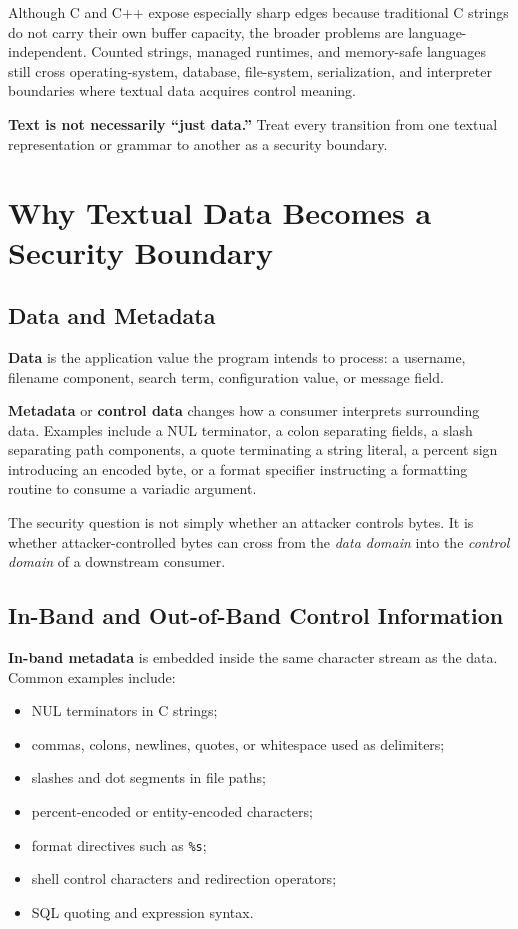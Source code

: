 \documentclass[11pt]{article}
\newcommand{\term}[1]{\textbf{#1}}
\begin{document}
Although C and C++ expose especially sharp edges because traditional C strings do not carry their own buffer capacity, the broader problems are language-independent. Counted strings, managed runtimes, and memory-safe languages still cross operating-system, database, file-system, serialization, and interpreter boundaries where textual data acquires control meaning.

\begin{securityprinciple}
\textbf{Text is not necessarily ``just data.''} Treat every transition from one textual representation or grammar to another as a security boundary.
\end{securityprinciple}

\section{Why Textual Data Becomes a Security Boundary}

\subsection{Data and Metadata}

\term{Data} is the application value the program intends to process: a username, filename component, search term, configuration value, or message field.

\term{Metadata} or \term{control data} changes how a consumer interprets surrounding data. Examples include a NUL terminator, a colon separating fields, a slash separating path components, a quote terminating a string literal, a percent sign introducing an encoded byte, or a format specifier instructing a formatting routine to consume a variadic argument.

The security question is not simply whether an attacker controls bytes. It is whether attacker-controlled bytes can cross from the \emph{data domain} into the \emph{control domain} of a downstream consumer.
\clearpage

\subsection{In-Band and Out-of-Band Control Information}

\term{In-band metadata} is embedded inside the same character stream as the data. Common examples include:
\begin{itemize}
  \item NUL terminators in C strings;
  \item commas, colons, newlines, quotes, or whitespace used as delimiters;
  \item slashes and dot segments in file paths;
  \item percent-encoded or entity-encoded characters;
  \item format directives such as \texttt{\%s};
  \item shell control characters and redirection operators;
  \item SQL quoting and expression syntax.
\end{itemize}
\end{document}
